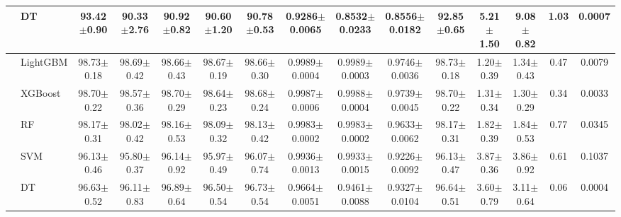\begin{tabular}{@{}llccccccccccccc@{}}
 & DT & 93.42{\tiny$\pm$0.90} & 90.33{\tiny$\pm$2.76} & 90.92{\tiny$\pm$0.82} & 90.60{\tiny$\pm$1.20} & 90.78{\tiny$\pm$0.53} & 0.9286{\tiny$\pm$0.0065} & 0.8532{\tiny$\pm$0.0233} & 0.8556{\tiny$\pm$0.0182} & 92.85{\tiny$\pm$0.65} & 5.21{\tiny$\pm$1.50} & 9.08{\tiny$\pm$0.82} & 1.03 & 0.0007\\
\midrule
{} & LightGBM & 98.73{\tiny$\pm$0.18} & 98.69{\tiny$\pm$0.42} & 98.66{\tiny$\pm$0.43} & 98.67{\tiny$\pm$0.19} & 98.66{\tiny$\pm$0.30} & 0.9989{\tiny$\pm$0.0004} & 0.9989{\tiny$\pm$0.0003} & 0.9746{\tiny$\pm$0.0036} & 98.73{\tiny$\pm$0.18} & 1.20{\tiny$\pm$0.39} & 1.34{\tiny$\pm$0.43} & 0.47 & 0.0079\\
 & XGBoost & 98.70{\tiny$\pm$0.22} & 98.57{\tiny$\pm$0.36} & 98.70{\tiny$\pm$0.29} & 98.64{\tiny$\pm$0.23} & 98.68{\tiny$\pm$0.24} & 0.9987{\tiny$\pm$0.0006} & 0.9988{\tiny$\pm$0.0004} & 0.9739{\tiny$\pm$0.0045} & 98.70{\tiny$\pm$0.22} & 1.31{\tiny$\pm$0.34} & 1.30{\tiny$\pm$0.29} & 0.34 & 0.0033\\
 & RF & 98.17{\tiny$\pm$0.31} & 98.02{\tiny$\pm$0.42} & 98.16{\tiny$\pm$0.53} & 98.09{\tiny$\pm$0.32} & 98.13{\tiny$\pm$0.42} & 0.9983{\tiny$\pm$0.0002} & 0.9983{\tiny$\pm$0.0002} & 0.9633{\tiny$\pm$0.0062} & 98.17{\tiny$\pm$0.31} & 1.82{\tiny$\pm$0.39} & 1.84{\tiny$\pm$0.53} & 0.77 & 0.0345\\
 & SVM & 96.13{\tiny$\pm$0.46} & 95.80{\tiny$\pm$0.37} & 96.14{\tiny$\pm$0.92} & 95.97{\tiny$\pm$0.49} & 96.07{\tiny$\pm$0.74} & 0.9936{\tiny$\pm$0.0013} & 0.9933{\tiny$\pm$0.0015} & 0.9226{\tiny$\pm$0.0092} & 96.13{\tiny$\pm$0.47} & 3.87{\tiny$\pm$0.36} & 3.86{\tiny$\pm$0.92} & 0.61 & 0.1037\\
 & DT & 96.63{\tiny$\pm$0.52} & 96.11{\tiny$\pm$0.83} & 96.89{\tiny$\pm$0.64} & 96.50{\tiny$\pm$0.54} & 96.73{\tiny$\pm$0.54} & 0.9664{\tiny$\pm$0.0051} & 0.9461{\tiny$\pm$0.0088} & 0.9327{\tiny$\pm$0.0104} & 96.64{\tiny$\pm$0.51} & 3.60{\tiny$\pm$0.79} & 3.11{\tiny$\pm$0.64} & 0.06 & 0.0004\\
\bottomrule
\end{tabular}